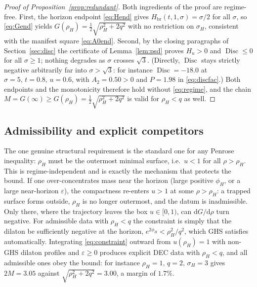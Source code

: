 \documentclass[11pt]{article}
\theoremstyle{plain}
\theoremstyle{definition}
\newcommand{\dd}{\mathrm{d}}
\newcommand{\rH}{\rho_{\!H}}
\newcommand{\Hbr}{H_{\mathrm{br}}}
\newcommand{\Disc}{\operatorname{Disc}}
\newcommand{\eps}{\varepsilon}
\begin{document}
\begin{proof}[Proof of Proposition~\ref{prop:redundant}]
Both ingredients of the proof are regime-free. First, the horizon endpoint \eqref{eq:Hend} gives
$\Hbr(t,1,\sigma)=\sigma/2$ for all $\sigma$, so \eqref{eq:Gend} yields $G(\rH)=\tfrac12\sqrt{\rH^2+2q^2}$ with
no restriction on $\sigma_H$, consistent with the manifest square \eqref{eq:A0end}. Second, by the closing
paragraphs of Section~\ref{sec:disc} the certificate of Lemma~\ref{lem:psd} proves $H_u>0$ and $\Disc\le0$ for
all $\sigma\ge1$; nothing degrades as $\sigma$ crosses $\sqrt3$. (Directly, $\Disc$ stays strictly negative
arbitrarily far into $\sigma>\sqrt3$: for instance $\Disc=-18.0$ at $\sigma=5,\,t=0.8,\,u=0.6$, with
$A_2=0.50>0$ and $P=1.98$ in \eqref{eq:discfac}.) Both endpoints and the monotonicity therefore hold without
\eqref{eq:regime}, and the chain $M=G(\infty)\ge G(\rH)=\tfrac12\sqrt{\rH^2+2q^2}$ is valid for $\rH<q$ as
well.
\end{proof}

\subsection{Admissibility and explicit competitors}\label{sec:admiss}

The one genuine structural requirement is the standard one for any Penrose inequality: $\rH$ must be the
outermost minimal surface, i.e.\ $u<1$ for all $\rho>\rH$. This is regime-independent and is exactly the
mechanism that protects the bound. If one over-concentrates mass near the horizon (large positive $\phi_H$, or
a large near-horizon $\eps$), the compactness re-enters $u>1$ at some $\rho>\rH$: a trapped surface forms
outside, $\rH$ is no longer outermost, and the datum is inadmissible. Only there, where the trajectory leaves
the box $u\in[0,1)$, can $\dd G/\dd\rho$ turn negative. For admissible data with $\rH<q$ the constraint is
simply that the dilaton be sufficiently negative at the horizon, $e^{2\phi_H}<\rH^2/q^2$, which GHS satisfies
automatically. Integrating \eqref{eq:constraint} outward from $u(\rH)=1$ with non-GHS dilaton profiles and
$\eps\ge0$ produces explicit DEC data with $\rH<q$, and all admissible ones obey the bound: for instance
$\rH=1,\,q=2,\,\sigma_H=3$ gives $2M=3.05$ against $\sqrt{\rH^2+2q^2}=3.00$, a margin of $1.7\%$.
\end{document}
